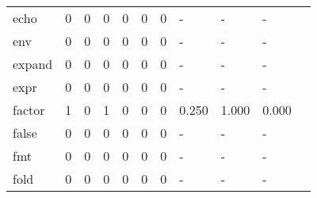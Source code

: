 \begin{longtable}{lp{1.10cm}p{1.10cm}p{1.10cm}p{1.10cm}p{1.10cm}p{1.10cm}p{1.10cm}p{1.10cm}p{1.10cm}p{1.10cm}}
echo      &                      0 &                                  0 &                                 0 &                                0 &                                 0 &                               0 &                              - &                                     - &                                   - \\
env       &                      0 &                                  0 &                                 0 &                                0 &                                 0 &                               0 &                              - &                                     - &                                   - \\
expand    &                      0 &                                  0 &                                 0 &                                0 &                                 0 &                               0 &                              - &                                     - &                                   - \\
expr      &                      0 &                                  0 &                                 0 &                                0 &                                 0 &                               0 &                              - &                                     - &                                   - \\
factor    &                      1 &                                  0 &                                 1 &                                0 &                                 0 &                               0 &                          0.250 &                                 1.000 &                               0.000 \\
false     &                      0 &                                  0 &                                 0 &                                0 &                                 0 &                               0 &                              - &                                     - &                                   - \\
fmt       &                      0 &                                  0 &                                 0 &                                0 &                                 0 &                               0 &                              - &                                     - &                                   - \\
fold      &                      0 &                                  0 &                                 0 &                                0 &                                 0 &                               0 &                              - &                                     - &                                   - \\

\end{longtable}
